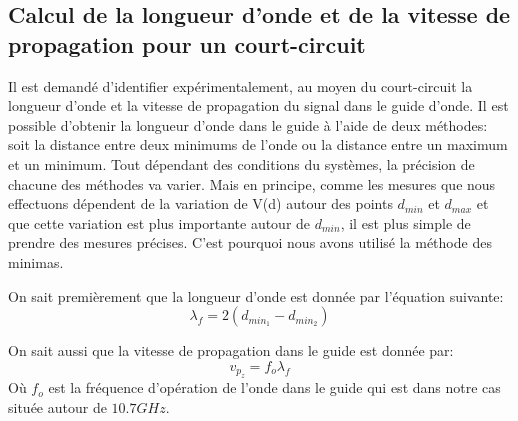 \subsection{Calcul de la longueur d'onde et de la vitesse de propagation pour un court-circuit}
Il est demandé d'identifier expérimentalement, au moyen du court-circuit la longueur d'onde et la vitesse de propagation du signal dans le guide d'onde. Il est possible d'obtenir la longueur d'onde dans le guide à l'aide de deux méthodes: soit la distance entre deux minimums de l'onde ou la distance entre un maximum et un minimum. Tout dépendant des conditions du systèmes, la précision de chacune des méthodes va varier. Mais en principe, comme les mesures que nous effectuons dépendent de la variation de V(d) autour des points $d_{min}$ et $d_{max}$ et que cette variation est plus importante autour de $d_{min}$, il est plus simple de prendre des mesures précises. C'est pourquoi nous avons utilisé la méthode des minimas.

On sait premièrement que la longueur d'onde est donnée par l'équation suivante:
\begin{equation}
    \lambda_f = 2(d_{min_1} - d_{min_2})
\end{equation}

On sait aussi que la vitesse de propagation dans le guide est donnée par:
\begin{equation}
\label{eq:eq1}
    v_{p_z} = f_o\lambda_f
\end{equation}
Où $f_o$ est la fréquence d'opération de l'onde dans le guide qui est dans notre cas située autour de $10.7 GHz$.

